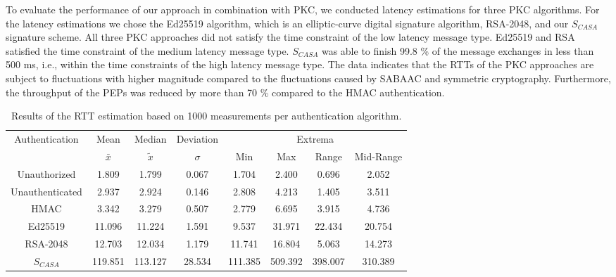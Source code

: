 To evaluate the performance of our approach in combination with PKC, we conducted latency estimations for three PKC algorithms.
For the latency estimations we chose the Ed25519 algorithm, which is an elliptic-curve digital signature algorithm, RSA-2048, and our $S_{CASA}$ signature scheme.
All three PKC approaches did not satisfy the time constraint of the low latency message type.
Ed25519 and RSA satisfied the time constraint of the medium latency message type.
$S_{CASA}$ was able to finish 99.8 \% of the message exchanges in less than 500 ms, i.e., within the time constraints of the high latency message type.
The data indicates that the RTTs of the PKC approaches are subject to fluctuations with higher magnitude compared to the fluctuations caused by SABAAC and symmetric cryptography.
Furthermore, the throughput of the PEPs was reduced by more than 70 \% compared to the HMAC authentication.
\begin{table}
    \centering
    \small
    \caption{Results of the RTT estimation based on 1000 measurements per authentication algorithm.}
    \label{tab:rtt_metrics}
    \begin{tabular}{c c c c c c c c}
    \toprule
    Authentication & Mean & Median & Deviation & \multicolumn{4}{c}{Extrema}\\
    \cmidrule(lr){5-8}
    & $\bar{x}$ & $\widetilde{x}$ & $\sigma$ & Min & Max & Range & Mid-Range\\
    \midrule
    Unauthorized    & 1.809 & 1.799 & 0.067 & 1.704 & 2.400 & 0.696 & 2.052 \\
    Unauthenticated & 2.937 & 2.924 & 0.146 & 2.808 & 4.213 & 1.405 & 3.511 \\
    HMAC            & 3.342 & 3.279 & 0.507 & 2.779 & 6.695 & 3.915 & 4.736 \\
    Ed25519        & 11.096 & 11.224& 1.591 & 9.537 & 31.971& 22.434 & 20.754 \\
    RSA-2048       & 12.703 & 12.034& 1.179 & 11.741& 16.804& 5.063 & 14.273 \\
    $S_{CASA}$    & 119.851 &113.127&28.534 &111.385&509.392&398.007&310.389\\
    \bottomrule
    \end{tabular}
\end{table}
